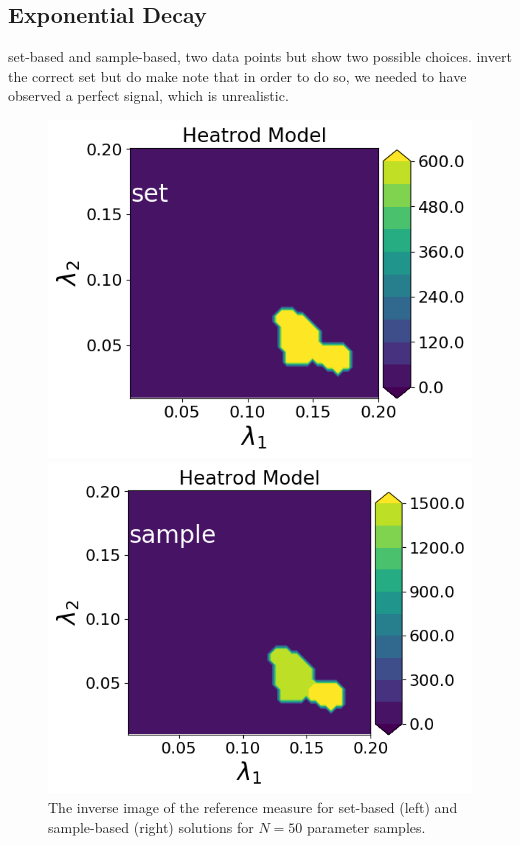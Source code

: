 \subsection{Exponential Decay}\label{ex:decay-set-sample}

set-based and sample-based, two data points but show two possible choices.
invert the correct set but do make note that in order to do so, we needed to have observed a perfect signal, which is unrealistic.


\begin{figure}[h]
\begin{minipage}{.475\textwidth}
\includegraphics[width=\linewidth]{examples/fig_heatrod_q1/tHeatrodModel--set_N50_em.png}
\end{minipage}
\begin{minipage}{.475\textwidth}
\includegraphics[width=\linewidth]{examples/fig_heatrod_q1/tHeatrodModel--sample_N50_mc.png}
\end{minipage}
\caption{The inverse image of the reference measure for set-based (left) and sample-based (right) solutions for $N=50$ parameter samples.}
\label{fig:heatrod-sol-ex}
\end{figure}
